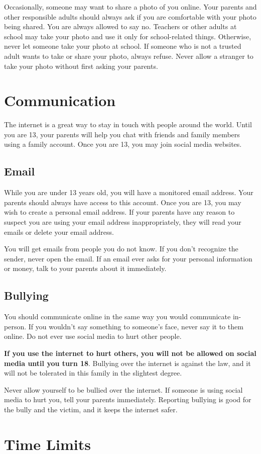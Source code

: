 Occasionally, someone may want to share a photo of you online. Your parents and other responsible adults should always ask if you are comfortable with your photo being shared. You are always allowed to say no. Teachers or other adults at school may take your photo and use it only for school-related things. Otherwise, never let someone take your photo at school.
If someone who is not a trusted adult wants to take or share your photo, always refuse. Never allow a stranger to take your photo without first asking your parents.


\chapter{Communication}

The internet is a great way to stay in touch with people around the world. Until you are 13, your parents will help you chat with friends and family members using a family account. Once you are 13, you may join social media websites. 

\section*{Email}

While you are under 13 years old, you will have a monitored email address. Your parents should always have access to this account. Once you are 13, you may wish to create a personal email address. If your parents have any reason to suspect you are using your email address inappropriately, they will read your emails or delete your email address.

You will get emails from people you do not know. If you don't recognize the sender, never open the email. If an email ever asks for your personal information or money, talk to your parents about it immediately. 

\section*{Bullying}

You should communicate online in the same way you would communicate in-person. If you wouldn't say something to someone's face, never say it to them online. Do not ever use social media to hurt other people.

\textbf{If you use the internet to hurt others, you will not be allowed on social media until you turn 18}. Bullying over the internet is against the law, and it will not be tolerated in this family in the slightest degree.

Never allow yourself to be bullied over the internet. If someone is using social media to hurt you, tell your parents immediately. Reporting bullying is good for the bully and the victim, and it keeps the internet safer.


\chapter{Time Limits}

